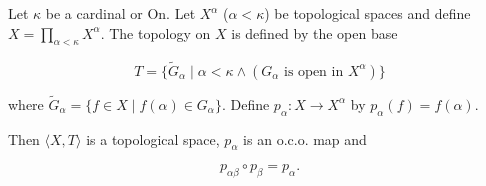 Let $\kappa$ be a cardinal or $\mathrm{On}$. Let $X^{\alpha}$ ($\alpha < \kappa$) be topological spaces and define $X = \prod_{\alpha < \kappa} X^{\alpha}$. The topology on $X$ is defined by the open base

$$T = \{\tilde{G}_{\alpha} \mid \alpha < \kappa \land (G_{\alpha} \text{ is open in } X^{\alpha})\}$$

where $\tilde{G}_{\alpha} = \{f \in X \mid f(\alpha) \in G_{\alpha}\}$. Define $p_{\alpha}: X \to X^{\alpha}$ by $p_{\alpha}(f) = f(\alpha)$.

Then $\langle X, T \rangle$ is a topological space, $p_{\alpha}$ is an o.c.o. map and

$$p_{\alpha\beta} \circ p_{\beta} = p_{\alpha}.$$
